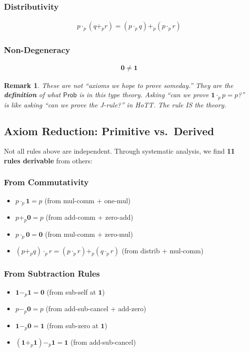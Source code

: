 \documentclass[11pt,a4paper]{article}
\newtheorem{remark}[theorem]{Remark}
\newcommand{\Prob}{\mathsf{Prob}}
\newcommand{\pzero}{\mathbf{0}}
\newcommand{\pone}{\mathbf{1}}
\newcommand{\padd}{+_p}
\newcommand{\pmul}{\cdot_p}
\newcommand{\psub}{-_p}
\begin{document}
\subsubsection*{Distributivity}
\begin{align}
&p \pmul (q \padd r) = (p \pmul q) \padd (p \pmul r) \tag{distrib}
\end{align}

\subsubsection*{Non-Degeneracy}
\begin{align}
&\pzero \neq \pone \tag{non-trivial}
\end{align}

\begin{remark}
These are not ``axioms we hope to prove someday.'' They are the \textbf{definition} of what $\Prob$ is in this type theory. Asking ``can we prove $\pone \pmul p = p$?'' is like asking ``can we prove the J-rule?'' in HoTT. The rule IS the theory.
\end{remark}

\subsection{Axiom Reduction: Primitive vs.\ Derived}

Not all rules above are independent. Through systematic analysis, we find \textbf{11 rules derivable} from others:

\subsubsection*{From Commutativity}
\begin{itemize}
    \item $p \pmul \pone = p$ (from mul-comm + one-mul)
    \item $p \padd \pzero = p$ (from add-comm + zero-add)
    \item $p \pmul \pzero = \pzero$ (from mul-comm + zero-mul)
    \item $(p \padd q) \pmul r = (p \pmul r) \padd (q \pmul r)$ (from distrib + mul-comm)
\end{itemize}

\subsubsection*{From Subtraction Rules}
\begin{itemize}
    \item $\pone \psub \pone = \pzero$ (from sub-self at $\pone$)
    \item $p \psub \pzero = p$ (from add-sub-cancel + add-zero)
    \item $\pone \psub \pzero = \pone$ (from sub-zero at $\pone$)
    \item $(\pone \padd \pone) \psub \pone = \pone$ (from add-sub-cancel)
\end{itemize}
\end{document}
